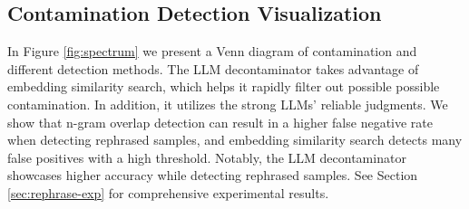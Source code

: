 


\subsection{Contamination Detection Visualization}



In Figure \ref{fig:spectrum} we present a Venn diagram of contamination and different detection methods.
The LLM decontaminator takes advantage of embedding similarity search, which helps it rapidly filter out possible possible contamination.
In addition, it utilizes the strong LLMs' reliable judgments.
We show that n-gram overlap detection can result in a higher false negative rate when detecting rephrased samples, and embedding similarity search detects many false positives with a high threshold. Notably, the LLM decontaminator showcases higher accuracy while detecting rephrased samples.
See Section \ref{sec:rephrase-exp} for comprehensive experimental results.

